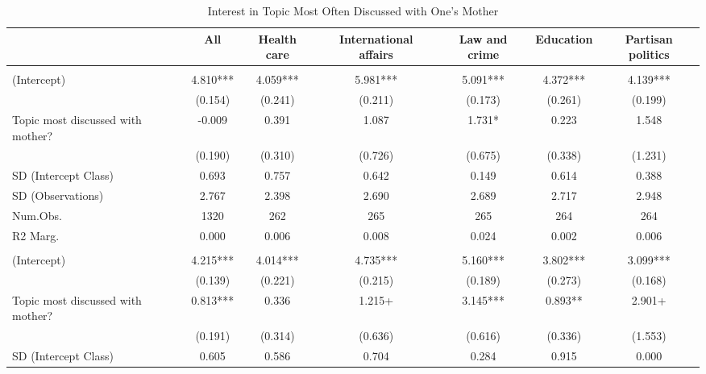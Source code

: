 \documentclass[
  letterpaper,
  DIV=11,
  numbers=noendperiod]{scrreprt}
\begin{document}
\begin{table}
\centering\centering
\caption{Interest in Topic Most Often Discussed with One's Mother \label{tab:lmeMother}}
\centering
\fontsize{6}{8}\selectfont
\begin{tabular}[t]{lcccccc}
\toprule
  & All & Health care & International affairs & Law and crime & Education & Partisan politics\\
\midrule
\addlinespace[0.5em]
\multicolumn{7}{l}{\textit{Boys}}\\
\midrule \hspace{1em}(Intercept) & 4.810*** & 4.059*** & 5.981*** & 5.091*** & 4.372*** & 4.139***\\
\hspace{1em} & (0.154) & (0.241) & (0.211) & (0.173) & (0.261) & (0.199)\\
\hspace{1em}Topic most discussed with mother? & -0.009 & 0.391 & 1.087 & 1.731* & 0.223 & 1.548\\
\hspace{1em} & (0.190) & (0.310) & (0.726) & (0.675) & (0.338) & (1.231)\\
\hspace{1em}SD (Intercept Class) & 0.693 & 0.757 & 0.642 & 0.149 & 0.614 & 0.388\\
\hspace{1em}SD (Observations) & 2.767 & 2.398 & 2.690 & 2.689 & 2.717 & 2.948\\
\hspace{1em}Num.Obs. & 1320 & 262 & 265 & 265 & 264 & 264\\
\hspace{1em}R2 Marg. & 0.000 & 0.006 & 0.008 & 0.024 & 0.002 & 0.006\\
\addlinespace[0.5em]
\multicolumn{7}{l}{\textit{Girls}}\\
\midrule \hspace{1em}(Intercept) & 4.215*** & 4.014*** & 4.735*** & 5.160*** & 3.802*** & 3.099***\\
\hspace{1em} & (0.139) & (0.221) & (0.215) & (0.189) & (0.273) & (0.168)\\
\hspace{1em}Topic most discussed with mother? & 0.813*** & 0.336 & 1.215+ & 3.145*** & 0.893** & 2.901+\\
\hspace{1em} & (0.191) & (0.314) & (0.636) & (0.616) & (0.336) & (1.553)\\
\hspace{1em}SD (Intercept Class) & 0.605 & 0.586 & 0.704 & 0.284 & 0.915 & 0.000\\

\end{tabular}
\end{table}
\end{document}
